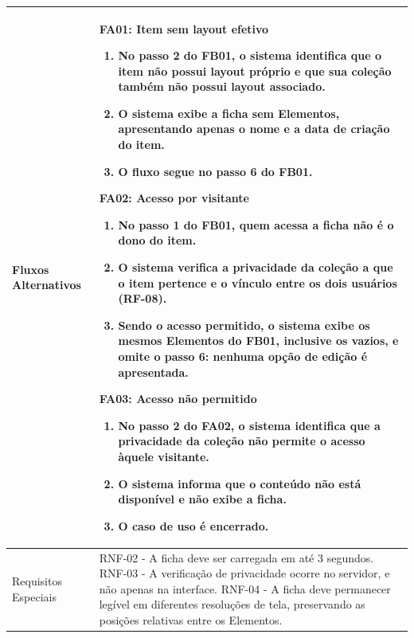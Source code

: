 \begin{longtable}{ >{\raggedright}p{2.8cm} | >{\raggedright\arraybackslash}p{10.7cm} }
Fluxos Alternativos & \mbox{}
\textbf{FA01:} Item sem layout efetivo
\vspace{2pt}
\begin{enumerate}[nosep,leftmargin=1.2em,topsep=0pt,partopsep=0pt,parsep=0pt,itemsep=0pt,after=\vspace{2pt}]
    \item No passo 2 do FB01, o sistema identifica que o item não possui layout próprio e que sua coleção também não possui layout associado.
    \item O sistema exibe a ficha sem Elementos, apresentando apenas o nome e a data de criação do item.
    \item O fluxo segue no passo 6 do FB01.
\end{enumerate}

\textbf{FA02:} Acesso por visitante
\vspace{2pt}
\begin{enumerate}[nosep,leftmargin=1.2em,topsep=0pt,partopsep=0pt,parsep=0pt,itemsep=0pt,after=\vspace{2pt}]
    \item No passo 1 do FB01, quem acessa a ficha não é o dono do item.
    \item O sistema verifica a privacidade da coleção a que o item pertence e o vínculo entre os dois usuários (RF-08).
    \item Sendo o acesso permitido, o sistema exibe os mesmos Elementos do FB01, inclusive os vazios, e omite o passo 6: nenhuma opção de edição é apresentada.
\end{enumerate}

\textbf{FA03:} Acesso não permitido
\vspace{2pt}
\begin{enumerate}[nosep,leftmargin=1.2em,topsep=0pt,partopsep=0pt,parsep=0pt,itemsep=0pt,after=\vspace{2pt}]
    \item No passo 2 do FA02, o sistema identifica que a privacidade da coleção não permite o acesso àquele visitante.
    \item O sistema informa que o conteúdo não está disponível e não exibe a ficha.
    \item O caso de uso é encerrado.
\end{enumerate}
\mbox{} \\ \hline

Requisitos Especiais & RNF-02 - A ficha deve ser carregada em até 3 segundos. RNF-03 - A verificação de privacidade ocorre no servidor, e não apenas na interface. RNF-04 - A ficha deve permanecer legível em diferentes resoluções de tela, preservando as posições relativas entre os Elementos. \\ \hline


\end{longtable}
